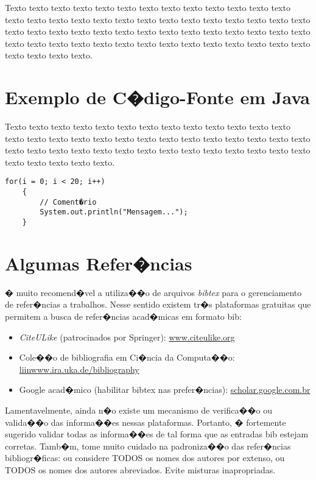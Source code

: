 Texto texto texto texto texto texto texto texto texto texto texto texto texto
texto texto texto texto texto texto texto texto texto texto texto texto texto
texto texto texto texto texto texto texto texto texto texto texto texto texto
texto texto texto texto texto texto texto texto texto texto texto texto texto
texto texto texto texto texto texto texto.


\section{Exemplo de C�digo-Fonte em Java}
\label{sec:exemplo_codigo_fonte}
Texto texto texto texto texto texto texto texto texto texto texto texto texto
texto texto texto texto texto texto texto texto texto texto texto texto texto
texto texto texto texto texto texto texto texto texto texto texto texto texto
texto texto texto texto texto texto texto.


\begin{lstlisting}[frame=trbl]
    for(i = 0; i < 20; i++)
    {
        // Coment�rio 
        System.out.println("Mensagem...");
    }
\end{lstlisting}


\section{Algumas Refer�ncias}
\label{sec:algumas_referencias}

� muito recomend�vel a utiliza��o de arquivos \emph{bibtex} para o gerenciamento
de refer�ncias a trabalhos. Nesse sentido existem tr�s plataformas gratuitas
que permitem a busca de refer�ncias acad�micas em formato bib: 
\begin{itemize}
	\item \emph{CiteULike} (patrocinados por Springer): \url{www.citeulike.org}
	\item Cole��o de bibliografia em Ci�ncia da Computa��o: \url{liinwww.ira.uka.de/bibliography}
	\item Google acad�mico (habilitar bibtex nas prefer�ncias): \url{scholar.google.com.br}
\end{itemize}
Lamentavelmente, ainda n�o existe um mecanismo de verifica��o ou valida��o das
informa��es nessas plataformas. Portanto, � fortemente sugerido validar todas
as informa��es de tal forma que as entradas bib estejam corretas.  Tamb�m, tome
muito cuidado na padroniza��o das refer�ncias bibliogr�ficas: ou considere TODOS
os nomes dos autores por extenso, ou TODOS os nomes dos autores abreviados.
Evite misturas inapropriadas.

